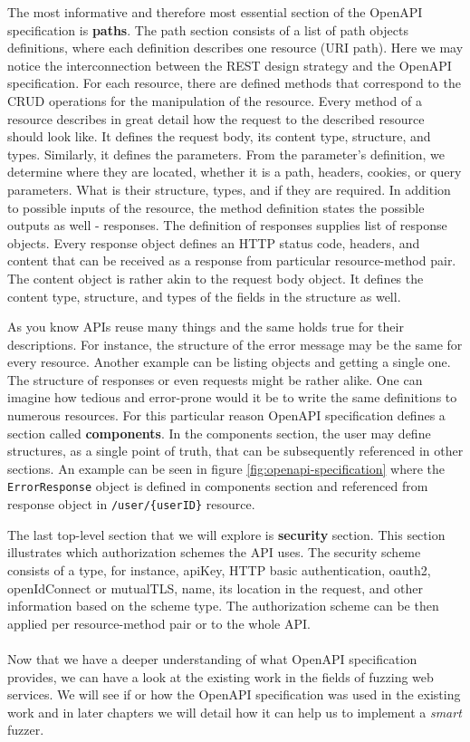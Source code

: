 The most informative and therefore most essential section of the OpenAPI specification is \textbf{paths}. The path section consists of a list of path objects definitions, where each definition describes one resource (URI path). Here we may notice the interconnection between the REST design strategy and the OpenAPI specification. For each resource, there are defined methods that correspond to the CRUD operations for the manipulation of the resource. Every method of a resource describes in great detail how the request to the described resource should look like. It defines the request body, its content type, structure, and types. Similarly, it defines the parameters. From the parameter's definition, we determine where they are located, whether it is a path, headers, cookies, or query parameters. What is their structure, types, and if they are required. In addition to possible inputs of the resource, the method definition states the possible outputs as well - responses. The definition of responses supplies list of response objects. Every response object defines an HTTP status code, headers, and content that can be received as a response from particular resource-method pair. The content object is rather akin to the request body object. It defines the content type, structure, and types of the fields in the structure as well.

\label{subsec:components}
As you know APIs reuse many things and the same holds true for their descriptions. For instance, the structure of the error message may be the same for every resource. Another example can be listing objects and getting a single one. The structure of responses or even requests might be rather alike. One can imagine how tedious and error-prone would it be to write the same definitions to numerous resources. For this particular reason OpenAPI specification defines a section called \textbf{components}. In the components section, the user may define structures, as a single point of truth, that can be subsequently referenced in other sections. An example can be seen in figure \ref{fig:openapi-specification} where the \texttt{ErrorResponse} object is defined in components section and referenced from response object in \texttt{/user/\{userID\}} resource.

The last top-level section that we will explore is \textbf{security} section. This section illustrates which authorization schemes the API uses. The security scheme consists of a type, for instance, apiKey, HTTP basic authentication, oauth2, openIdConnect or mutualTLS, name, its location in the request, and other information based on the scheme type. The authorization scheme can be then applied per resource-method pair or to the whole API.


\paragraph{}
Now that we have a deeper understanding of what OpenAPI specification provides, we can have a look at the existing work in the fields of fuzzing web services. We will see if or how the OpenAPI specification was used in the existing work and in later chapters we will detail how it can help us to implement a \emph{smart} fuzzer.
